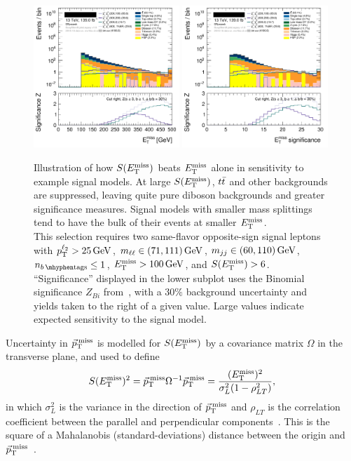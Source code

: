 \begin{figure}[tp]
\centering
\includegraphics[width=0.49\textwidth]{figures/2ljets_presel_met_logy.png}
\hfill
\includegraphics[width=0.49\textwidth]{figures/2ljets_presel_met_sig_logy.png}
\caption{
Illustration of how $\metsig$ beats $\met$ alone in sensitivity to
example signal models.
At large $\metsig$, $\ttbar$ and other backgrounds are suppressed, leaving
quite pure diboson backgrounds and greater significance measures.
Signal models with smaller mass splittings tend to have the bulk of their
events at smaller $\met$.
\\[0.5em]
This selection requires two same-flavor opposite-sign signal leptons with
$\pt^{\ell_2} > 25\,\eV[G]$,
$\mll \in (71, 111)\,\eV[G]$,
$\mjj \in (60, 110)\,\eV[G]$,
$\nbtag \leq 1$,
$\met > 100\,\eV[G]$, and
$\metsig > 6$.
\\[0.5em]
``Significance'' displayed in the lower subplot uses the Binomial significance
$Z_{Bi}$ from~\cite{cousins2008evaluation}, with a $30\%$ background
uncertainty and yields taken to the right of a given value.
Large values indicate expected sensitivity to the signal model.
}
\label{fig:2ljets_presel_met}
\end{figure}

Uncertainty in $\ptmiss$ is modelled for $\metsig$ by a covariance matrix
$\Omega$ in the transverse plane, and used to define
\begin{equation}
\metsig^2
=
\ptmiss \Omega^{-1} \ptmiss
=
\frac{(\met)^2}{\sigma_L^2(1 - \rho_{LT}^2)}
,
\end{equation}
in which $\sigma_L^2$ is the variance in the direction of $\ptmiss$ and
$\rho_{LT}$ is the correlation coefficient between the parallel and
perpendicular components~\cite{atlas_met_significance}.
This is the square of a Mahalanobis (standard-deviations) distance between
the origin and $\ptmiss$~\cite{mahalanobis1936generalised}.

